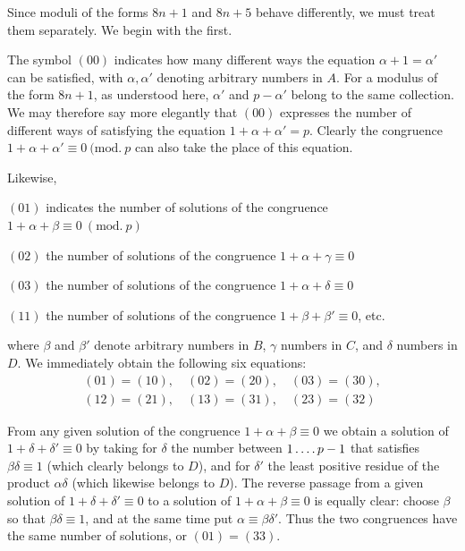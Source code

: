 Since moduli of the forms $8n+1$ and $8n+5$ behave differently, we must treat them separately. We begin with the first.

The symbol $(00)$ indicates how many different ways the equation $\alpha+1=\alpha'$ can be satisfied, with $\alpha,\alpha'$ denoting arbitrary numbers in $A$. For a modulus of the form $8n+1$, as understood here, $\alpha'$ and $p-\alpha'$ belong to the same collection. We may therefore say more elegantly that $(00)$ expresses the number of different ways of satisfying the equation $1+\alpha+\alpha'=p$. Clearly the congruence $1+\alpha+\alpha'\equiv0\ (\mathrm{mod.}\ p$ can also take the place of this equation.

Likewise,
\begin{center}
\begin{minipage}{\linewidth}
$(01)$ indicates the number of solutions of the congruence $1+\alpha+\beta\equiv0\ (\mathrm{mod.}\ p)$\par
$(02)$ the number of solutions of the congruence $1+\alpha+\gamma\equiv0$\par
$(03)$ the number of solutions of the congruence $1+\alpha+\delta\equiv0$\par
$(11)$ the number of solutions of the congruence $1+\beta+\beta'\equiv0$, etc.
\end{minipage}
\end{center}
where $\beta$ and $\beta'$ denote arbitrary numbers in $B$, $\gamma$ numbers in $C$, and $\delta$ numbers in $D$. We immediately obtain the following six equations:
\[
\begin{gathered}
(01)=(10),\quad(02)=(20),\quad(03)=(30),\\
(12)=(21),\quad(13)=(31),\quad(23)=(32)
\end{gathered}
\]

From any given solution of the congruence $1+\alpha+\beta\equiv0$ we obtain a solution of $1+\delta+\delta'\equiv0$ by taking for $\delta$ the number between $1\mathinner{.\,.\,.\,.} p-1$\space%
%
that satisfies $\beta\delta\equiv1$ (which clearly belongs to $D$), and for $\delta'$ the least positive residue of the product $\alpha\delta$ (which likewise belongs to $D$). The reverse passage from a given solution of $1+\delta+\delta'\equiv0$ to a solution of $1+\alpha+\beta\equiv0$ is equally clear: choose $\beta$ so that $\beta\delta\equiv1$, and at the same time put $\alpha\equiv\beta\delta'$. Thus the two congruences have the same number of solutions, or $(01)=(33)$.

